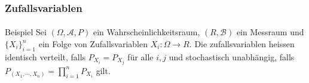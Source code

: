 \documentclass{beamer}
\begin{document}
\begin{frame}
    \frametitle{Zufallsvariablen}
\framesubtitle{}
\begin{block}{Beispiel}
Sei $(\Omega, \mathcal{A}, P)$ ein Wahrscheinlichkeitsraum, $(R, \mathcal{B})$ ein Messraum  und
 $\{X_i\}_{i=1}^n$ ein Folge von Zufallsvariablen   $X_i :  \Omega \to R$.
Die zufallsvariablen heissen identisch verteilt, falls
 $P_{X_i} = P_{X_j}$ für alle $i,j$  und
stochastisch unabhängig, falls
 $P_{(X_1, \cdots ,X_n)} = \prod_{i=1}^n P_{X_i}$ gilt. 
\end{block}
 \end{frame}
\end{document}

